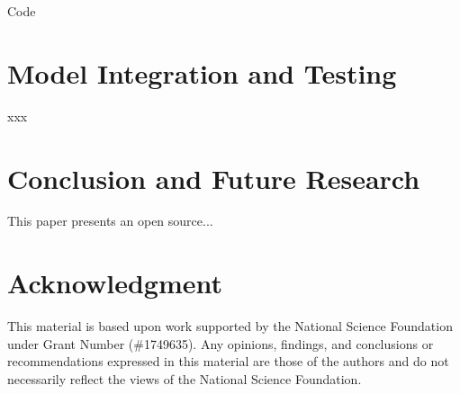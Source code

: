 \documentclass[conference]{IEEEtran}
\begin{document}



Code

\section{Model Integration and Testing}\label{sec:Integration}
xxx

\section{Conclusion and Future Research}\label{sec:Concl}
This paper presents an open source...

\section*{Acknowledgment}
This material is based upon work supported by the National Science Foundation under Grant Number (\#1749635). Any opinions, findings, and conclusions or recommendations expressed in this material are those of the authors and do not necessarily reflect the views of the National Science Foundation.

%
%
\end{document}
